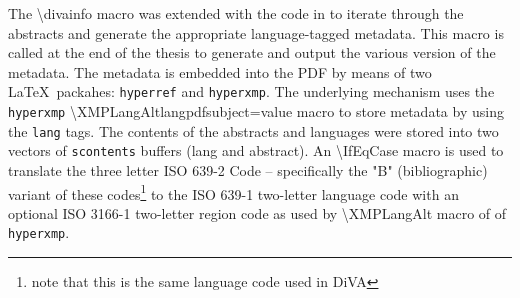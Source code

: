 The \textbackslash divainfo macro was extended with the code in  to iterate through the abstracts and generate the appropriate language-tagged metadata. This macro is called at the end of the thesis to generate and output the various version of the metadata. The metadata is embedded into the PDF by means of two \LaTeX~packahes: \texttt{hyperref} and \texttt{hyperxmp}. The underlying mechanism uses the \texttt{hyperxmp} \textbackslash XMPLangAlt{lang}{pdfsubject=value} macro to store metadata by using the \texttt{lang} tags. The contents of the abstracts and languages were stored into two vectors of \texttt{scontents} buffers (lang and abstract). An \textbackslash IfEqCase macro is used to translate the three letter ISO 639-2 Code – specifically the "B" (bibliographic) variant of these codes\footnote{note that this is the same language code used in DiVA} to the ISO 639-1 two-letter language code with an optional ISO 3166-1 two-letter region code as used by \textbackslash XMPLangAlt macro of of \texttt{hyperxmp}.

